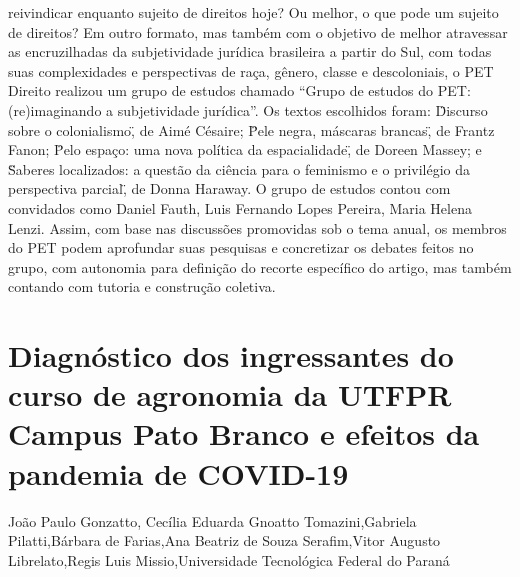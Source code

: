 reivindicar enquanto sujeito de direitos hoje? Ou melhor, o que pode um sujeito de direitos?
Em outro formato, mas também com o objetivo de melhor atravessar as encruzilhadas da
subjetividade jurídica brasileira a partir do Sul, com todas suas complexidades e perspectivas de
raça, gênero, classe e descoloniais, o PET Direito realizou um grupo de estudos chamado “Grupo
de estudos do PET: (re)imaginando a subjetividade jurídica”. Os textos escolhidos foram:
\"Discurso sobre o colonialismo\", de Aimé Césaire; \"Pele negra, máscaras brancas\", de Frantz
Fanon; \"Pelo espaço: uma nova política da espacialidade\", de Doreen Massey; e \"Saberes
localizados: a questão da ciência para o feminismo e o privilégio da perspectiva parcial\", de
Donna Haraway. O grupo de estudos contou com convidados como Daniel Fauth, Luis Fernando
Lopes Pereira, Maria Helena Lenzi. Assim, com base nas discussões promovidas sob o tema
anual, os membros do PET podem aprofundar suas pesquisas e concretizar os debates feitos no
grupo, com autonomia para definição do recorte específico do artigo, mas também contando com
tutoria e construção coletiva.



\section{Diagnóstico dos ingressantes do curso de agronomia da UTFPR Campus Pato Branco e efeitos da pandemia de COVID-19}

João Paulo Gonzatto, Cecília Eduarda Gnoatto Tomazini,Gabriela Pilatti,Bárbara de Farias,Ana Beatriz de Souza Serafim,Vitor Augusto Librelato,Regis Luis Missio,Universidade Tecnológica Federal do Paraná

